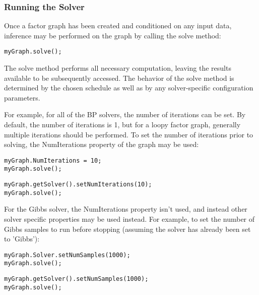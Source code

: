 \fi

\subsubsection{Running the Solver}

Once a factor graph has been created and conditioned on any input data, inference may be performed on the graph by calling the solve method:

\begin{lstlisting}
myGraph.solve();
\end{lstlisting}

The solve method performs all necessary computation, leaving the results available to be subsequently accessed.  The behavior of the solve method is determined by the chosen schedule as well as by any solver-specific configuration parameters.

For example, for all of the BP solvers, the number of iterations can be set.  By default, the number of iterations is 1, but for a loopy factor graph, generally multiple iterations should be performed.  To set the number of iterations prior to solving, the NumIterations property of the graph may be used:

\ifmatlab

\begin{lstlisting}
myGraph.NumIterations = 10;
myGraph.solve();
\end{lstlisting}

\fi

\ifjava

\begin{lstlisting}
myGraph.getSolver().setNumIterations(10);
myGraph.solve();
\end{lstlisting}


\fi

For the Gibbs solver, the NumIterations property isn't used, and instead other solver specific properties may be used instead.  For example, to set the number of Gibbs samples to run before stopping (assuming the solver has already been set to 'Gibbs'):

\ifmatlab
\begin{lstlisting}
myGraph.Solver.setNumSamples(1000);
myGraph.solve();
\end{lstlisting}
\fi

\ifjava
\begin{lstlisting}
myGraph.getSolver().setNumSamples(1000);
myGraph.solve();
\end{lstlisting}
\fi

